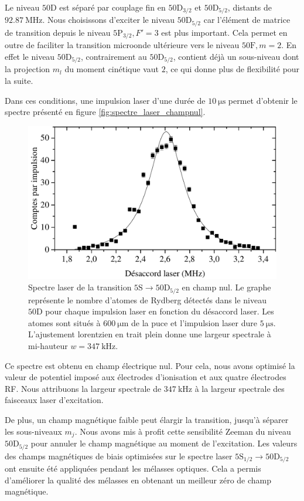 Le niveau $\mathrm{50D}$ est séparé par couplage fin en $\mathrm{50D}_{3/2}$ et $\mathrm{50D}_{5/2}$, distants de $\SI{92.87}{\MHz}$.
Nous choisissons d'exciter le niveau $\mathrm{50D}_{5/2}$ car l'élément de matrice de transition depuis le niveau $\mathrm{5P}_{3/2},F'=3$ est plus important.
Cela permet en outre de faciliter la transition microonde ultérieure vers le niveau $\mathrm{50F},m=2$.
En effet le niveau $\mathrm{50D}_{5/2}$, contrairement au $\mathrm{50D}_{5/2}$, contient déjà un sous-niveau dont la projection $m_l$ du moment cinétique vaut $2$, ce qui donne plus de flexibilité pour la suite.

Dans ces conditions, une impulsion laser d'une durée de $\SI{10}{\us}$ permet d'obtenir le spectre présenté en figure \eqref{fig:spectre_laser_champnul}.
%
\begin{figure}[!h]
\centering
\includegraphics[width=0.85\linewidth]{figures/circulars/spectre_laser_champnul}
\caption[Spectre laser de la transition $\mathrm{5S\rightarrow 50D_{5/2}}$ en champ nul]{
Spectre laser de la transition $\mathrm{5S\rightarrow 50D_{5/2}}$ en champ nul.
Le graphe représente le nombre d'atomes de Rydberg détectés dans le niveau $\mathrm{50D}$ pour chaque impulsion laser en fonction du désaccord laser.
Les atomes sont situés à $\SI{600}{\um}$ de la puce et l'impulsion laser dure $\SI{5}{\us}$.
L'ajustement lorentzien en trait plein donne une largeur spectrale à mi-hauteur $w =\SI{347}{\kHz}$.
}
\label{fig:spectre_laser_champnul}
\end{figure}

Ce spectre est obtenu en champ électrique nul.
Pour cela, nous avons optimisé la valeur de potentiel imposé aux électrodes d'ionisation et aux quatre électrodes RF.
Nous attribuons la largeur spectrale de $\SI{347}{\kHz}$ à la largeur spectrale des faisceaux laser d'excitation.

De plus, un champ magnétique faible peut élargir la transition, jusqu'à séparer les sous-niveaux $m_j$.
Nous avons mis à profit cette sensibilité Zeeman du niveau $\mathrm{50D_{5/2}}$ pour annuler le champ magnétique au moment de l'excitation.
Les valeurs des champs magnétiques de biais optimisées sur le spectre laser $\mathrm{5S_{1/2}} \rightarrow \mathrm{50D_{5/2}}$ ont ensuite été appliquées pendant les mélasses optiques.
Cela a permis d'améliorer la qualité des mélasses en obtenant un meilleur zéro de champ magnétique.
		
